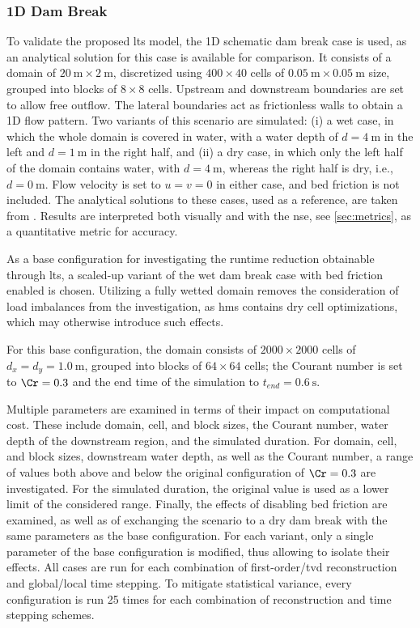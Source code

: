 \subsubsection{1D Dam Break} \label{sec:case-dambreak}
To validate the proposed \gls{lts} model, the \gls{1D} schematic dam break case is used,
as an analytical solution for this case is available for comparison.
It consists of a domain of $\SI{20}{\meter} \times \SI{2}{\meter}$, discretized using $400 \times 40$ cells of $\SI{0.05}{\meter} \times \SI{0.05}{\meter}$ size, grouped into blocks of $8 \times 8$ cells.
Upstream and downstream boundaries are set to allow free outflow. 
The lateral boundaries act as frictionless walls to obtain a \gls{1D} flow pattern.
Two variants of this scenario are simulated:
(i) a wet case, in which the whole domain is covered in water, with a water depth of $d = \SI{4}{\meter}$ in the left and $d = \SI{1}{\meter}$ in the right half,
and (ii) a dry case, in which only the left half of the domain contains water, with $d = \SI{4}{\meter}$, whereas the right half is dry, i.e., $d = \SI{0}{\meter}$.
Flow velocity is set to $u=v=0$ in either case, 
and bed friction is not included.
The analytical solutions to these cases, used as a reference, are taken from \textcite{adelmann2022}.
Results are interpreted both visually and with the \gls{nse}, see \autoref{sec:metrics}, as a quantitative metric for accuracy.

As a base configuration for investigating the runtime reduction obtainable through \gls{lts}, a scaled-up variant of the wet dam break case with bed friction enabled is chosen.
Utilizing a fully wetted domain removes the consideration of load imbalances from the investigation, as \gls{hms} contains dry cell optimizations, which may otherwise introduce such effects.

For this base configuration, the domain consists of $2000 \times 2000$ cells of $d_x = d_y = \SI{1.0}{\meter}$, grouped into blocks of $64 \times 64$ cells; 
the Courant number is set to $\Cr = 0.3$ and the end time of the simulation to $t_{end} = \SI{0.6}{\second}$.

Multiple parameters are examined in terms of their impact on computational cost. 
These include domain, cell, and block sizes, the Courant number, water depth of the downstream region, and the simulated duration.
For domain, cell, and block sizes, downstream water depth, as well as the Courant number, a range of values both above and below the original configuration of $\Cr = 0.3$ are investigated.
For the simulated duration, the original value is used as a lower limit of the considered range.
Finally, the effects of disabling bed friction are examined, as well as of exchanging the scenario to a dry dam break with the same parameters as the base configuration.
For each variant, only a single parameter of the base configuration is modified, thus allowing to isolate their effects. 
All cases are run for each combination of first-order/\gls{tvd} reconstruction and global/local time stepping. 
To mitigate statistical variance, every configuration is run 25 times for each combination of reconstruction and time stepping schemes.

